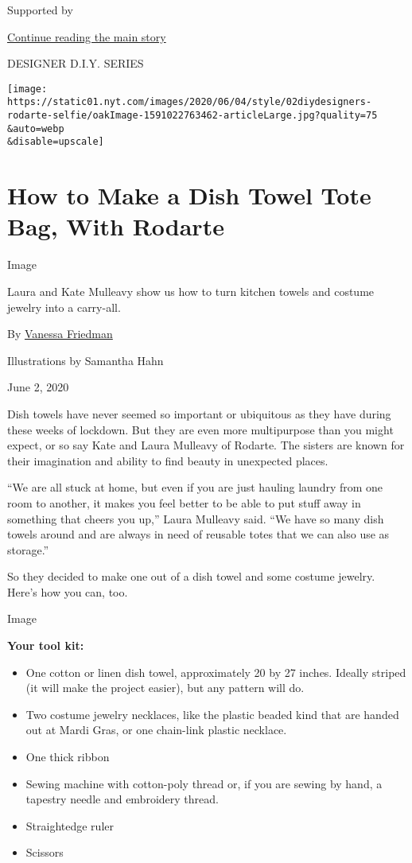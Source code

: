 Supported by

\protect\hyperlink{after-sponsor}{Continue reading the main story}

DESIGNER D.I.Y. SERIES

\texttt{[image: https://static01.nyt.com/images/2020/06/04/style/02diydesigners-rodarte-selfie/oakImage-1591022763462-articleLarge.jpg?quality=75\\\&auto=webp\\\&disable=upscale]}

\hypertarget{how-to-make-a-dish-towel-tote-bag-with-rodarte}{%
\section{How to Make a Dish Towel Tote Bag, With
Rodarte}\label{how-to-make-a-dish-towel-tote-bag-with-rodarte}}

Image

Laura and Kate Mulleavy show us how to turn kitchen towels and costume
jewelry into a carry-all.

By \href{https://www.nytimes.com/by/vanessa-friedman}{Vanessa Friedman}

Illustrations by Samantha Hahn

June 2, 2020

Dish towels have never seemed so important or ubiquitous as they have
during these weeks of lockdown. But they are even more multipurpose than
you might expect, or so say Kate and Laura Mulleavy of Rodarte. The
sisters are known for their imagination and ability to find beauty in
unexpected places.

``We are all stuck at home, but even if you are just hauling laundry
from one room to another, it makes you feel better to be able to put
stuff away in something that cheers you up,'' Laura Mulleavy said. ``We
have so many dish towels around and are always in need of reusable totes
that we can also use as storage.''

So they decided to make one out of a dish towel and some costume
jewelry. Here's how you can, too.

Image

\textbf{Your tool kit:}

\begin{itemize}
\item
  One cotton or linen dish towel, approximately 20 by 27 inches. Ideally
  striped (it will make the project easier), but any pattern will do.
\item
  Two costume jewelry necklaces, like the plastic beaded kind that are
  handed out at Mardi Gras, or one chain-link plastic necklace.
\item
  One thick ribbon
\item
  Sewing machine with cotton-poly thread or, if you are sewing by hand,
  a tapestry needle and embroidery thread.
\item
  Straightedge ruler
\item
  Scissors
\end{itemize}


